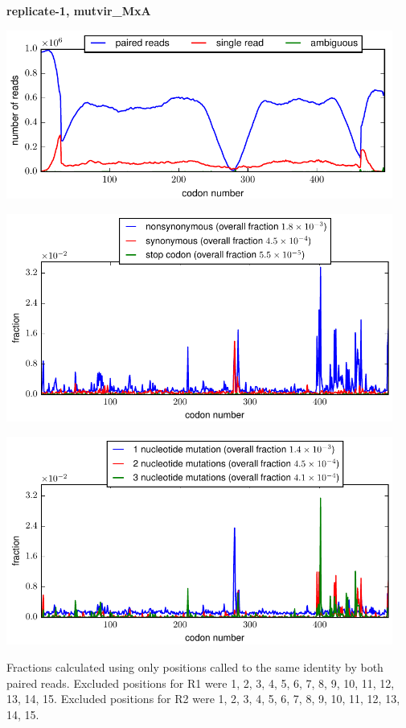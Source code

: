 \documentclass[10pt,letterpaper]{article}
\begin{document}
\centerline{\Large \bf replicate-1, mutvir\_MxA}
\vspace{0.1in}

\centerline{\includegraphics[width=5in]{replicate-1-mutvir_MxA_codondepth.pdf}}
\vspace{0.1in}

\centerline{\includegraphics[width=5in]{replicate-1-mutvir_MxA_syn-ns-dist.pdf}}
\vspace{0.1in}

\centerline{\includegraphics[width=5in]{replicate-1-mutvir_MxA_nmutspercodon-dist.pdf}}
\vspace{0.1in}

Fractions calculated using only positions called to the same identity by both paired reads.  Excluded positions for R1 were 1, 2, 3, 4, 5, 6, 7, 8, 9, 10, 11, 12, 13, 14, 15. 
 Excluded positions for R2 were 1, 2, 3, 4, 5, 6, 7, 8, 9, 10, 11, 12, 13, 14, 15. 
\end{document}
